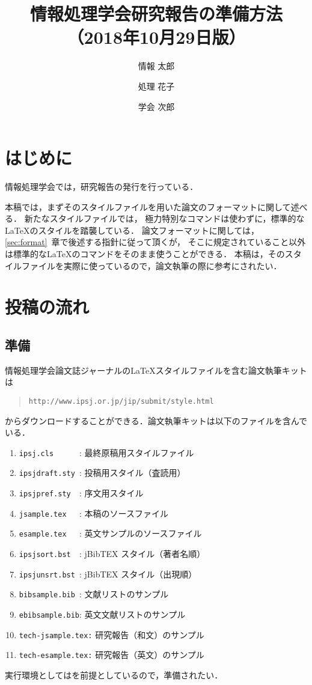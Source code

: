 \documentclass[submit,techrep,noauthor]{ipsj}
\title{情報処理学会研究報告の準備方法\\
（2018年10月29日版）}
\author{情報 太郎}{Joho Taro}{IPSJ}[joho.taro@ipsj.or.jp]
\author{処理 花子}{Shori Hanako}{IPSJ}
\author{学会 次郎}{Gakkai Jiro}{IPSJ,JU}[gakkai.jiro@ipsj.or.jp]
\def\|{\verb|}
\begin{document}
\maketitle

%1
\section{はじめに}

情報処理学会では，研究報告の発行を行っている．

本稿では，まずそのスタイルファイルを用いた論文のフォーマットに関して述べる．
新たなスタイルファイルでは，
極力特別なコマンドは使わずに，標準的な\LaTeX のスタイルを踏襲している．
論文フォーマットに関しては，\ref{sec:format}~章で後述する指針に従って頂くが，
そこに規定されていること以外は標準的な\LaTeX のコマンドをそのまま使うことができる．
本稿は，そのスタイルファイルを実際に使っているので，論文執筆の際に参考にされたい．




%2
\section{投稿の流れ}


%2.1
\subsection{準備}

情報処理学会論文誌ジャーナルの\LaTeX スタイルファイルを含む論文執筆キットは
\begin{quote}
\small
\|http://www.ipsj.or.jp/jip/submit/style.html|
\end{quote}
からダウンロードすることができる．論文執筆キットは以下のファイルを含んで
いる．
\begin{enumerate}
\item \|ipsj.cls      |: 最終原稿用スタイルファイル
\item \|ipsjdraft.sty |: 投稿用スタイル（査読用）
\item \|ipsjpref.sty  |: 序文用スタイル
\item \|jsample.tex   |: 本稿のソースファイル
\item \|esample.tex   |: 英文サンプルのソースファイル
\item \|ipsjsort.bst  |: jBibTEX スタイル（著者名順）
\item \|ipsjunsrt.bst |: jBibTEX スタイル（出現順）
\item \|bibsample.bib |: 文献リストのサンプル
\item \|ebibsample.bib|: 英文文献リストのサンプル
\item \|tech-jsample.tex:| 研究報告（和文）のサンプル
\item \|tech-esample.tex:| 研究報告（英文）のサンプル
\end{enumerate}
実行環境としては\LaTeXe を前提としているので，準備されたい．
\end{document}
